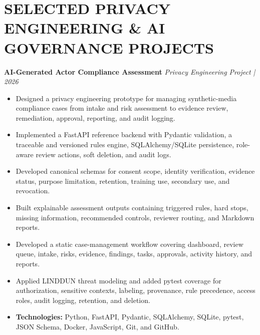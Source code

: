 \documentclass[10pt]{article}
\newcommand{\project}[2]{%
  \textbf{#1} \hfill \textit{#2}\\[-3pt]
}
\begin{document}
\section*{SELECTED PRIVACY ENGINEERING \& AI GOVERNANCE PROJECTS}
\project{AI-Generated Actor Compliance Assessment}{Privacy Engineering Project | 2026}
\begin{itemize}
  \item Designed a privacy engineering prototype for managing synthetic-media compliance cases from intake and risk assessment to evidence review, remediation, approval, reporting, and audit logging.
  \item Implemented a FastAPI reference backend with Pydantic validation, a traceable and versioned rules engine, SQLAlchemy/SQLite persistence, role-aware review actions, soft deletion, and audit logs.
  \item Developed canonical schemas for consent scope, identity verification, evidence status, purpose limitation, retention, training use, secondary use, and revocation.
  \item Built explainable assessment outputs containing triggered rules, hard stops, missing information, recommended controls, reviewer routing, and Markdown reports.
  \item Developed a static case-management workflow covering dashboard, review queue, intake, risks, evidence, findings, tasks, approvals, activity history, and reports.
  \item Applied LINDDUN threat modeling and added pytest coverage for authorization, sensitive contexts, labeling, provenance, rule precedence, access roles, audit logging, retention, and deletion.
  \item \textbf{Technologies:} Python, FastAPI, Pydantic, SQLAlchemy, SQLite, pytest, JSON Schema, Docker, JavaScript, Git, and GitHub.
\end{itemize}
\end{document}
